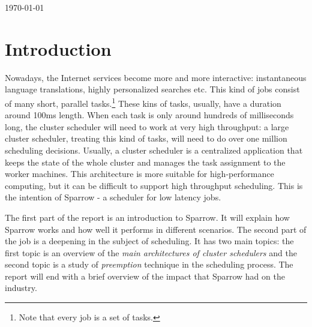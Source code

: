 \documentclass[11pt]{article}
\begin{document}
\begin{titlepage}


{\large \today}\\[2cm] %


 

\vfill %

\end{titlepage}


\section{Introduction}


	Nowadays, the Internet services become more and more interactive: instantaneous language translations, highly personalized searches etc. This kind of jobs consist of many short, parallel tasks.\footnote{Note that every job is a set of tasks.} These kins of tasks, usually, have a duration around 100ms length. When each task is only around hundreds of milliseconds long, the cluster scheduler will need to work at very high throughput: a large cluster scheduler, treating this kind of tasks, will need to do over one million scheduling decisions. Usually, a cluster scheduler is a centralized application that keeps the state of the whole cluster and manages the task assignment to the worker machines. This architecture is more suitable for high-performance computing, but it can be difficult to support high throughput scheduling. This is the intention of Sparrow - a scheduler for low latency jobs.

    The first part of the report is an introduction to Sparrow. It will explain how Sparrow works and how well it performs in different scenarios. The second part of the job is a deepening in the subject of scheduling. It has two main topics: the first topic is an overview of the \textit{main architectures of cluster schedulers} and the second topic is a study of \textit{preemption} technique in the scheduling process. The report will end with a brief overview of the impact that Sparrow had on the industry.
\end{document}
